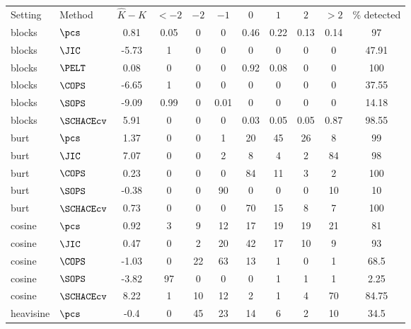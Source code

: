 \begin{table}[ht]
\centering
\begin{tabular}{llccccccccc}
 Setting & Method & $\hat{K} - K$ & $< -2$ & $-2$ & $-1$ & $0$ & $1$ & $2$ & $> 2$ & \% detected \\ 
 blocks & $\pcs$ &  0.81 &  0.05 &     0 &     0 &  0.46 &  0.22 &  0.13 &  0.14 &    97 \\ 
  blocks & $\JIC$ & -5.73 &     1 &     0 &     0 &     0 &     0 &     0 &     0 & 47.91 \\ 
  blocks & $\PELT$ &  0.08 &     0 &     0 &     0 &  0.92 &  0.08 &     0 &     0 &   100 \\ 
  blocks & $\COPS$ & -6.65 &     1 &     0 &     0 &     0 &     0 &     0 &     0 & 37.55 \\ 
   \hline
blocks & $\SOPS$ & -9.09 &  0.99 &     0 &  0.01 &     0 &     0 &     0 &     0 & 14.18 \\ 
  blocks & $\SCHACEcv$ &  5.91 &     0 &     0 &     0 &  0.03 &  0.05 &  0.05 &  0.87 & 98.55 \\ 
   \hline
burt & $\pcs$ &  1.37 &     0 &     0 &     1 &    20 &    45 &    26 &     8 &    99 \\ 
  burt & $\JIC$ &  7.07 &     0 &     0 &     2 &     8 &     4 &     2 &    84 &    98 \\ 
   \hline
burt & $\COPS$ &  0.23 &     0 &     0 &     0 &    84 &    11 &     3 &     2 &   100 \\ 
  burt & $\SOPS$ & -0.38 &     0 &     0 &    90 &     0 &     0 &     0 &    10 &    10 \\ 
  burt & $\SCHACEcv$ &  0.73 &     0 &     0 &     0 &    70 &    15 &     8 &     7 &   100 \\ 
  cosine & $\pcs$ &  0.92 &     3 &     9 &    12 &    17 &    19 &    19 &    21 &    81 \\ 
  cosine & $\JIC$ &  0.47 &     0 &     2 &    20 &    42 &    17 &    10 &     9 &    93 \\ 
  cosine & $\COPS$ & -1.03 &     0 &    22 &    63 &    13 &     1 &     0 &     1 &  68.5 \\ 
  cosine & $\SOPS$ & -3.82 &    97 &     0 &     0 &     0 &     1 &     1 &     1 &  2.25 \\ 
  cosine & $\SCHACEcv$ &  8.22 &     1 &    10 &    12 &     2 &     1 &     4 &    70 & 84.75 \\ 
  heavisine & $\pcs$ &  -0.4 &     0 &    45 &    23 &    14 &     6 &     2 &    10 &  34.5 \\ 

\end{tabular}
\end{table}
